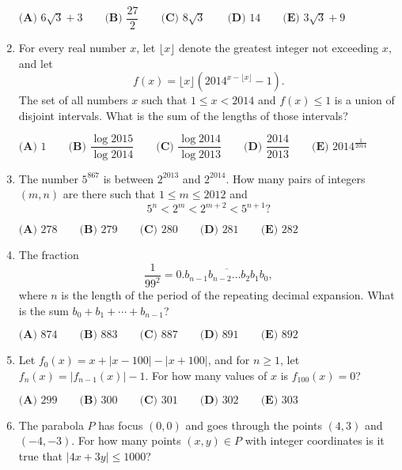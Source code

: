 \documentclass{article}
\begin{document}
\begin{enumerate}[label=\arabic*., itemsep=0.5em]
$\textbf{(A) }6\sqrt 3+3\qquad
\textbf{(B) }\dfrac{27}2\qquad
\textbf{(C) }8\sqrt 3\qquad
\textbf{(D) }14\qquad
\textbf{(E) }3\sqrt 3+9\qquad$\par \vspace{0.5em}\item For every real number $x$, let $\lfloor x\rfloor$ denote the greatest integer not exceeding $x$, and let 
\begin{equation*}
f(x)=\lfloor x\rfloor(2014^{x-\lfloor x\rfloor}-1).
\end{equation*}
  The set of all numbers $x$ such that $1\leq x<2014$ and $f(x)\leq 1$ is a union of disjoint intervals.  What is the sum of the lengths of those intervals?

$\textbf{(A) }1\qquad
\textbf{(B) }\dfrac{\log 2015}{\log 2014}\qquad
\textbf{(C) }\dfrac{\log 2014}{\log 2013}\qquad
\textbf{(D) }\dfrac{2014}{2013}\qquad
\textbf{(E) }2014^{\frac1{2014}}\qquad$\par \vspace{0.5em}\item The number $5^{867}$ is between $2^{2013}$ and $2^{2014}$.  How many pairs of integers $(m,n)$ are there such that $1\leq m\leq 2012$ and 
\begin{equation*}
5^n<2^m<2^{m+2}<5^{n+1}?
\end{equation*}

$\textbf{(A) }278\qquad
\textbf{(B) }279\qquad
\textbf{(C) }280\qquad
\textbf{(D) }281\qquad
\textbf{(E) }282\qquad$\par \vspace{0.5em}\item The fraction 
\begin{equation*}
\dfrac1{99^2}=0.\overline{b_{n-1}b_{n-2}\ldots b_2b_1b_0},
\end{equation*}
 where $n$ is the length of the period of the repeating decimal expansion.  What is the sum $b_0+b_1+\cdots+b_{n-1}$?

$\textbf{(A) }874\qquad
\textbf{(B) }883\qquad
\textbf{(C) }887\qquad
\textbf{(D) }891\qquad
\textbf{(E) }892\qquad$\par \vspace{0.5em}\item Let $f_0(x)=x+|x-100|-|x+100|$, and for $n\geq 1$, let $f_n(x)=|f_{n-1}(x)|-1$.  For how many values of $x$ is $f_{100}(x)=0$?

$\textbf{(A) }299\qquad
\textbf{(B) }300\qquad
\textbf{(C) }301\qquad
\textbf{(D) }302\qquad
\textbf{(E) }303\qquad$\par \vspace{0.5em}\item The parabola $P$ has focus $(0,0)$ and goes through the points $(4,3)$ and $(-4,-3)$.  For how many points $(x,y)\in P$ with integer coordinates is it true that $|4x+3y|\leq 1000$?


\end{enumerate}
\end{document}
